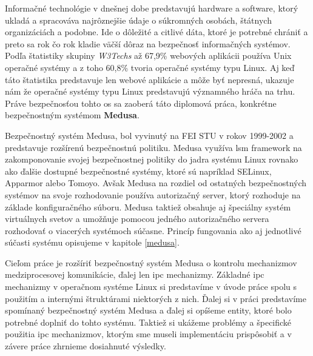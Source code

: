 Informačné technológie v dnešnej dobe predstavujú hardware a software, ktorý ukladá a spracováva najrôznejšie údaje o súkromných osobách, štátnych organizáciách a podobne. Ide o dôležité a citlivé dáta, ktoré je potrebné chrániť a preto sa rok čo rok kladie väčší dôraz na bezpečnosť informačných systémov. Podľa štatistiky skupiny \textit{W3Techs} až 67,9\% webových aplikácii používa Unix operačné systémy a z toho 60,8\% tvoria operačné systémy typu Linux.\cite{stats} Aj keď táto štatistika predstavuje len webové aplikácie a môže byť nepresná, ukazuje nám že operačné systémy typu Linux predstavujú významného hráča na trhu. Práve bezpečnosťou tohto \acrshort{os} sa zaoberá táto diplomová práca, konkrétne bezpečnostným systémom \textbf{Medusa}.

Bezpečnostný systém Medusa, bol vyvinutý na FEI STU v rokov 1999-2002 a predstavuje rozšírenú bezpečnostnú politiku. Medusa využíva \acrshort{lsm} framework na zakomponovanie svojej bezpečnostnej politiky do jadra systému Linux rovnako ako ďalšie dostupné bezpečnostné systémy, ktoré sú napríklad SELinux, Apparmor alebo Tomoyo. Avšak Medusa na rozdiel od ostatných bezpečnostných systémov na svoje rozhodovanie používa autorizačný server, ktorý rozhoduje na základe konfiguračného súboru. Medusa taktiež obsahuje aj špeciálny systém virtuálnych svetov a umožňuje pomocou jedného autorizačného servera rozhodovať o viacerých systémoch súčasne. Princíp fungovania ako aj jednotlivé súčasti systému opisujeme v kapitole \ref{medusa}.

Cieľom práce je rozšíriť bezpečnostný systém Medusa o kontrolu mechanizmov medziprocesovej komunikácie, ďalej len \acrshort{ipc} mechanizmy. Základné \acrshort{ipc} mechanizmy v operačnom systéme Linux si predstavíme v úvode práce spolu s použitím a internými štruktúrami niektorých z nich. Ďalej si v práci predstavíme spomínaný bezpečnostný systém Medusa a ďalej si opíšeme entity, ktoré bolo potrebné doplniť do tohto systému. Taktiež si ukážeme problémy a špecifické použitia \acrshort{ipc} mechanizmov, ktorým sme museli implementáciu prispôsobiť a v závere práce zhrnieme dosiahnuté výsledky. 